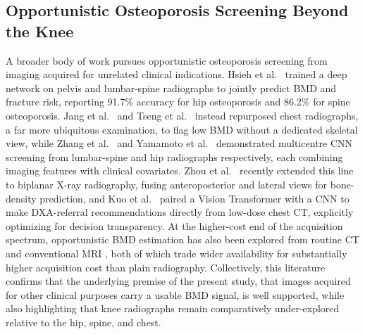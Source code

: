 \documentclass[journal]{IEEEtran}
\begin{document}
\subsection{Opportunistic Osteoporosis Screening Beyond the Knee}
A broader body of work pursues opportunistic osteoporosis screening from imaging
acquired for unrelated clinical indications. Hsieh et al.\
\cite{hsieh2021automated} trained a deep network on pelvis and lumbar-spine
radiographs to jointly predict BMD and fracture risk, reporting 91.7\% accuracy
for hip osteoporosis and 86.2\% for spine osteoporosis. Jang et al.\
\cite{jang2022opportunistic} and Tseng et al.\ \cite{tseng2024clinical} instead
repurposed chest radiographs, a far more ubiquitous examination, to flag low BMD
without a dedicated skeletal view, while Zhang et al.\ \cite{zhang2020deep} and
Yamamoto et al.\ \cite{yamamoto2020deep} demonstrated multicentre CNN screening
from lumbar-spine and hip radiographs respectively, each combining imaging
features with clinical covariates. Zhou et al.\ \cite{zhou2025novel} recently
extended this line to biplanar X-ray radiography, fusing anteroposterior and
lateral views for bone-density prediction, and Kuo et al.\ \cite{kuo2025vision}
paired a Vision Transformer with a CNN to make DXA-referral recommendations
directly from low-dose chest CT, explicitly optimizing for decision
transparency. At the higher-cost end of the acquisition spectrum, opportunistic
BMD estimation has also been explored from routine CT
\cite{park2024automated, oh2024evaluation} and conventional MRI
\cite{galbusera2024estimating}, both of which trade wider availability for
substantially higher acquisition cost than plain radiography. Collectively, this
literature confirms that the underlying premise of the present study, that
images acquired for other clinical purposes carry a usable BMD signal, is well
supported, while also highlighting that knee radiographs remain comparatively
under-explored relative to the hip, spine, and chest.
\end{document}
